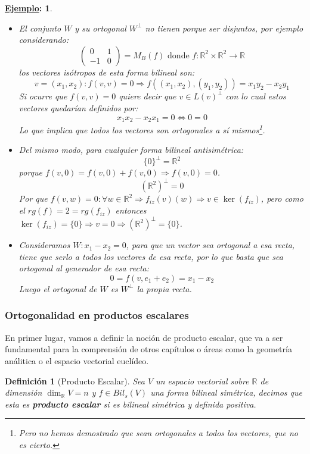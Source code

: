 \documentclass[10pt,a4paper,openright]{book}
\theoremstyle{break}
\newtheorem*{defi}{Definición}
\newtheorem*{ej}{\underline{Ejemplo}:}
\begin{document}
\begin{ej}
\begin{itemize}
\item El conjunto $W$ y su ortogonal $W^\perp$ no tienen porque ser disjuntos, por ejemplo considerando:
$$\begin{pmatrix}
0 & 1\\ -1 & 0\end{pmatrix}=M_B(f)\mbox{ donde }f:\mathbb R^2\times \mathbb R^2\rightarrow \mathbb R$$
los vectores isótropos de esta forma bilineal son:
$$v=(x_1,x_2): f(v,v)=0\Rightarrow f((x_1,x_2), (y_1,y_2))=x_1y_2- x_2y_1$$
Si ocurre que $f(v,v)=0$ quiere decir que $v\in L(v)^\perp$ con lo cual estos vectores quedarían definidos por:
$$x_1x_2-x_2x_1=0\Leftrightarrow 0=0$$
Lo que implica que todos los vectores son ortogonales a sí mismos\footnote{Pero no hemos demostrado que sean ortogonales a todos los vectores, que no es cierto.}.

\item Del mismo modo, para cualquier forma bilineal antisimétrica:
$$\{0\}^\perp = \mathbb R^2$$
porque $f(v,0) = f(v,0)+f(v,0)\Rightarrow f(v,0)=0$.
$$(\mathbb R^2)^\perp = 0$$
Por que $f(v,w)=0: \forall w \in \mathbb R^2\Rightarrow f_{iz}(v)(w)\Rightarrow v\in \ker(f_{iz})$, pero como el $rg(f)=2=rg(f_{iz})$ entonces $\ker(f_{iz})=\{0\}\Rightarrow v = 0\Rightarrow (\mathbb R^2)^\perp = \{0\}$.

\item Consideramos $W: x_1-x_2=0$, para que un vector sea ortogonal a esa recta, tiene que serlo a todos los vectores de esa recta, por lo que basta que sea ortogonal al generador de esa recta:
$$0=f(v,e_1+e_2)=x_1-x_2$$
Luego el ortogonal de $W$ es $W^\perp$ la propia recta.
\end{itemize}
\end{ej}

\subsubsection{Ortogonalidad en productos escalares}
En primer lugar, vamos a definir la noción de producto escalar, que va a ser fundamental para la comprensión de otros capítulos o áreas como la geometría análitica o el espacio vectorial euclídeo.

\begin{defi}[Producto Escalar]
Sea $V$ un espacio vectorial sobre $\mathbb{R}$ de dimensión $\dim_{\mathbb R} V = n$ y $f\in Bil_s(V)$ una forma bilineal simétrica, decimos que esta es \textbf{producto escalar} si es bilineal simétrica y definida positiva.
\end{defi}
\end{document}
